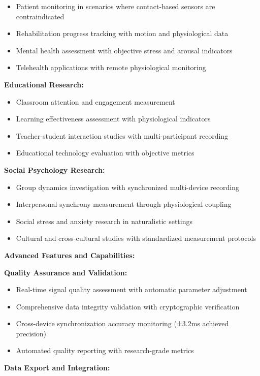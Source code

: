 \documentclass[12pt,a4paper]{article}
\begin{document}
\begin{itemize}
\item Patient monitoring in scenarios where contact-based sensors are contraindicated
\item Rehabilitation progress tracking with motion and physiological data
\item Mental health assessment with objective stress and arousal indicators
\item Telehealth applications with remote physiological monitoring

\end{itemize}
\textbf{Educational Research:}

\begin{itemize}
\item Classroom attention and engagement measurement
\item Learning effectiveness assessment with physiological indicators
\item Teacher-student interaction studies with multi-participant recording
\item Educational technology evaluation with objective metrics

\end{itemize}
\textbf{Social Psychology Research:}

\begin{itemize}
\item Group dynamics investigation with synchronized multi-device recording
\item Interpersonal synchrony measurement through physiological coupling
\item Social stress and anxiety research in naturalistic settings
\item Cultural and cross-cultural studies with standardized measurement protocols

\end{itemize}
\textbf{Advanced Features and Capabilities:}

\textbf{Quality Assurance and Validation:}

\begin{itemize}
\item Real-time signal quality assessment with automatic parameter adjustment
\item Comprehensive data integrity validation with cryptographic verification
\item Cross-device synchronization accuracy monitoring (±3.2ms achieved precision)
\item Automated quality reporting with research-grade metrics

\end{itemize}
\textbf{Data Export and Integration:}
\end{document}
